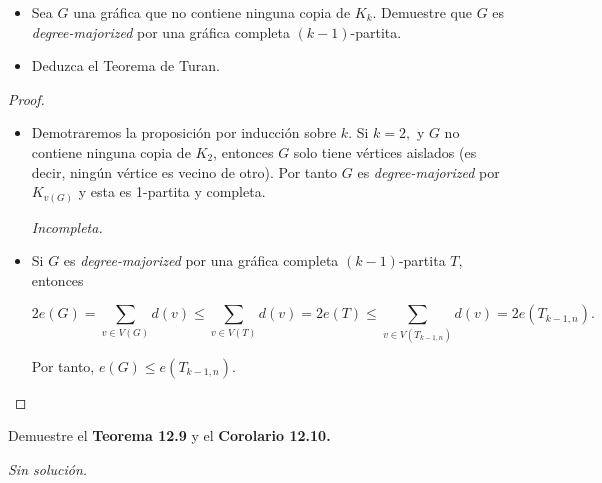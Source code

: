 \documentclass[12pt]{article}
\newenvironment{problem}[2][Problema]{\begin{trivlist}
\item[\hskip \labelsep {\bfseries #1}\hskip \labelsep {\bfseries #2.}]}{\end{trivlist}}
\begin{document}
\begin{problem}{12.2.5} \textbf{}
\begin{itemize}
    \item[a)] Sea $G$ una gráfica que no contiene ninguna copia de $K_k$. Demuestre que $G$ es \textit{degree-majorized} por una gráfica completa $(k-1)$-partita. 
    \item[b)] Deduzca el Teorema de Turan.
\end{itemize}
\end{problem}
\begin{proof}
\textbf{}
\begin{itemize}
    \item[a)] Demotraremos la proposición por inducción sobre $k.$ Si $k=2,$ y $G$ no contiene ninguna copia de $K_2$, entonces $G$ solo tiene vértices aislados (es decir, ningún vértice es vecino de otro). Por tanto $G$ es \textit{degree-majorized} por $K_{v(G)}$ y esta es 1-partita y completa. 
    
    \textit{Incompleta.}
    
    \item[b)] Si $G$ es \textit{degree-majorized} por una gráfica completa $(k-1)$-partita $T$, entonces 
    
    $$ 2 e(G) = \sum_{v \in V(G)} d(v) \leq \sum_{v \in V(T)} d(v) = 2 e(T)  \leq \sum_{v \in V(T_{k-1, n})} d(v) = 2 e(T_{k-1, n}). $$
    
    Por tanto, $e(G) \leq e(T_{k-1, n}).$
\end{itemize}
\end{proof}


\begin{problem}{12.3.3} Demuestre el \textbf{Teorema 12.9} y el \textbf{Corolario 12.10.}
\end{problem}
\textit{Sin solución.}


\printbibliography
\end{document}
